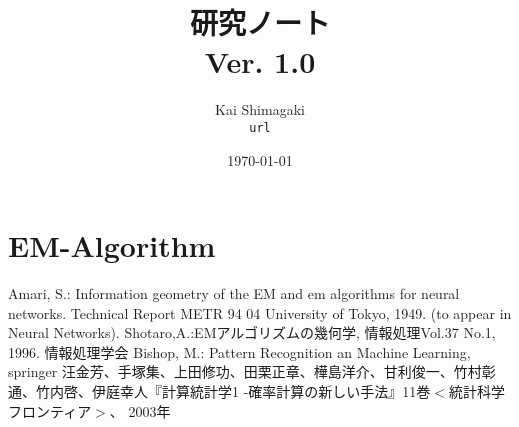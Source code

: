 \documentclass[a4j,10pt,oneside,openany]{jsbook}
\title{{\Huge \textbf{研究ノート}}\\ {\small Ver. 1.0}}
\author{Kai Shimagaki\\ \texttt{url}}
\date{\today}
\begin{document}
%
%
\maketitle
\frontmatter
\tableofcontents
%
%
\mainmatter

\chapter{EM-Algorithm}
		

\begin{thebibliography}{3}
 Amari, S.: Information geometry of the EM and em algorithms for neural networks. Technical Report METR 94 04 University of Tokyo, 1949. (to appear in Neural Networks).
Shotaro,A.:EMアルゴリズムの幾何学, 情報処理Vol.37 No.1, 1996. 情報処理学会
Bishop, M.: Pattern Recognition an Machine Learning, springer
汪金芳、手塚集、上田修功、田栗正章、樺島洋介、甘利俊一、竹村彰通、竹内啓、伊庭幸人『計算統計学1 -確率計算の新しい手法』11巻$<$統計科学フロンティア$>$、 2003年
\end{thebibliography}

\newpage
\printindex
%
%
\end{document}
